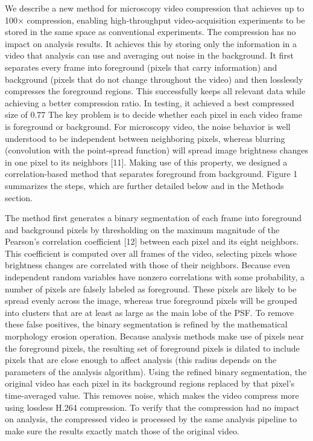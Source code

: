 We describe a new method for microscopy video compression that achieves up to 100× compression, enabling high-throughput video-acquisition experiments to be stored in the same space as conventional experiments.  The compression has no impact on analysis results.  It achieves this by storing only the information in a video that analysis can use and averaging out noise in the background. It first separates every frame into foreground (pixels that carry information) and background (pixels that do not change throughout the video) and then losslessly compresses the foreground regions.  This successfully keeps all relevant data while achieving a better compression ratio.  In testing, it achieved a best compressed size of 0.77%
The key problem is to decide whether each pixel in each video frame is foreground or background.  For microscopy video, the noise behavior is well understood to be independent between neighboring pixels, whereas blurring (convolution with the point-spread function) will spread image brightness changes in one pixel to its neighbors [11].  Making use of this property, we designed a correlation-based method that separates foreground from background.  Figure 1 summarizes the steps, which are further detailed below and in the Methods section.

The method first generates a binary segmentation of each frame into foreground and background pixels by thresholding on the maximum magnitude of the Pearson’s correlation coefficient [12] between each pixel and its eight neighbors.  This coefficient is computed over all frames of the video, selecting pixels whose brightness changes are correlated with those of their neighbors.
Because even independent random variables have nonzero correlations with some probability, a number of pixels are falsely labeled as foreground.  These pixels are likely to be spread evenly across the image, whereas true foreground pixels will be grouped into clusters that are at least as large as the main lobe of the PSF.  To remove these false positives, the binary segmentation is refined by the mathematical morphology erosion operation.
Because analysis methods make use of pixels near the foreground pixels, the resulting set of foreground pixels is dilated to include pixels that are close enough to affect analysis (this radius depends on the parameters of the analysis algorithm).
Using the refined binary segmentation, the original video has each pixel in its background regions replaced by that pixel’s time-averaged value.  This removes noise, which makes the video compress more using lossless H.264 compression.
To verify that the compression had no impact on analysis, the compressed video is processed by the same analysis pipeline to make sure the results exactly match those of the original video.

